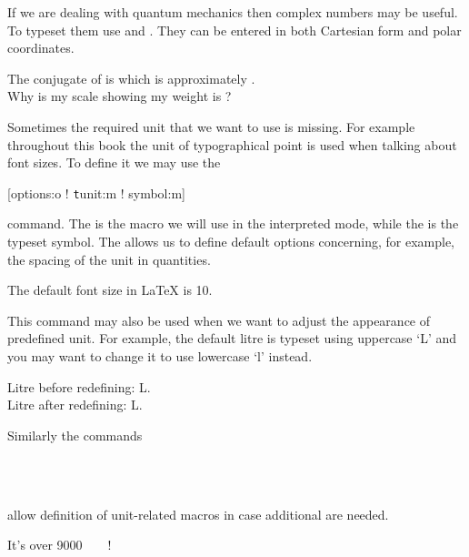 If we are dealing with quantum mechanics then complex numbers may be useful.
To typeset them use  and . They can be entered in
both Cartesian form and polar coordinates.

\begin{example}[examplewidth=0.4\linewidth]
The conjugate of  is
 which is approximately
. \\
Why is my scale showing my
weight is ?
\end{example}

Sometimes the required unit that we want to use is missing. For example
throughout this book the unit of typographical point is used when talking about
font sizes. To define it we may use the
\begin{lscommand}
  [options:o ! \texttt{t}unit:m ! symbol:m]
\end{lscommand}
command. The  is the macro we will use in the interpreted mode,
while the  is the typeset symbol. The  allows us to
define default options concerning, for example, the spacing of the unit in
quantities.
\begin{example}
The default font size
in \LaTeX{} is \qty{10}{\pt}.
\end{example}

This command may also be used when we want to adjust the appearance of
predefined unit. For example, the default litre is typeset using uppercase
\enquote*{L} and you may want to change it to use lowercase \enquote*{l}
instead.
\begin{example}[examplewidth=0.4\linewidth]
Litre before redefining: \unit{\L}. \\
Litre after redefining: \unit{\L}.
\end{example}

Similarly the commands
\begin{lscommand}
      \\
       \\
\end{lscommand}
allow definition of unit-related macros in case additional are needed.
\begin{example}[examplewidth=0.4\linewidth]
\DeclareSIPower\quartic{}
\DeclareSIPrefix{}
\DeclareSIQualifier{}

It's over
\qty{9000}{\quartic\decakilo\pt\polymer}!
\end{example}

